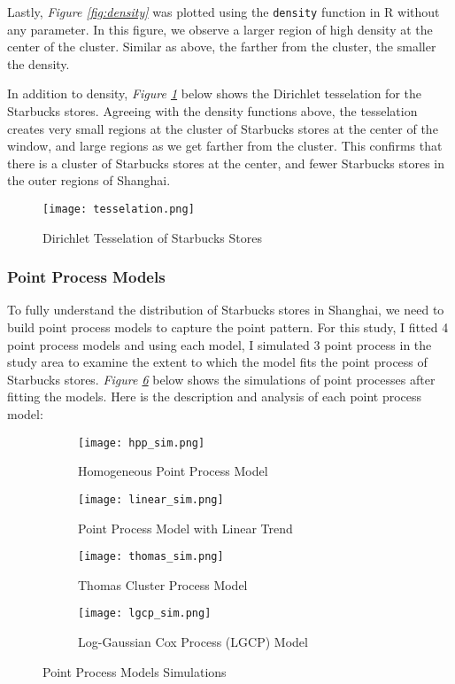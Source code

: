 \documentclass{article}
\begin{document}
Lastly, \textit{Figure \ref{fig:density}} was plotted using the \texttt{density} function in R without any parameter. In this figure, we observe a larger region of high density at the center of the cluster. Similar as above, the farther from the cluster, the smaller the density.

In addition to density, \textit{Figure \ref{fig:tesselation}} below shows the Dirichlet tesselation for the Starbucks stores. Agreeing with the density functions above, the tesselation creates very small regions at the cluster of Starbucks stores at the center of the window, and large regions as we get farther from the cluster. This confirms that there is a cluster of Starbucks stores at the center, and fewer Starbucks stores in the outer regions of Shanghai.

\begin{figure}[htbp]
    \centering
    \texttt{[image: tesselation.png]}
    \caption{Dirichlet Tesselation of Starbucks Stores}
    \label{fig:tesselation}
\end{figure}

\subsubsection{Point Process Models}

To fully understand the distribution of Starbucks stores in Shanghai, we need to build point process models to capture the point pattern. For this study, I fitted 4 point process models and using each model, I simulated 3 point process in the study area to examine the extent to which the model fits the point process of Starbucks stores. \textit{Figure \ref{fig:sims}} below shows the simulations of point processes after fitting the models. Here is the description and analysis of each point process model:

\begin{figure}[htbp]
    \begin{subfigure}[b]{0.48\textwidth}
        \centering
        \texttt{[image: hpp\_sim.png]}
        \caption{Homogeneous Point Process Model}
        \label{fig:hppm}
    \end{subfigure}
    \hfill
    \begin{subfigure}[b]{0.48\textwidth}
        \centering
        \texttt{[image: linear\_sim.png]}
        \caption{Point Process Model with Linear Trend}
        \label{fig:linear_ppm}
    \end{subfigure}
    \hfill
    \begin{subfigure}[b]{0.48\textwidth}
        \centering
        \texttt{[image: thomas\_sim.png]}
        \caption{Thomas Cluster Process Model}
        \label{fig:thomas_ppm}
    \end{subfigure}
    \hfill
    \begin{subfigure}[b]{0.48\textwidth}
        \centering
        \texttt{[image: lgcp\_sim.png]}
        \caption{Log-Gaussian Cox Process (LGCP) Model}
        \label{fig:lgcp_ppm}
    \end{subfigure}
    \caption{Point Process Models Simulations}
    \label{fig:sims}
\end{figure}
\end{document}
